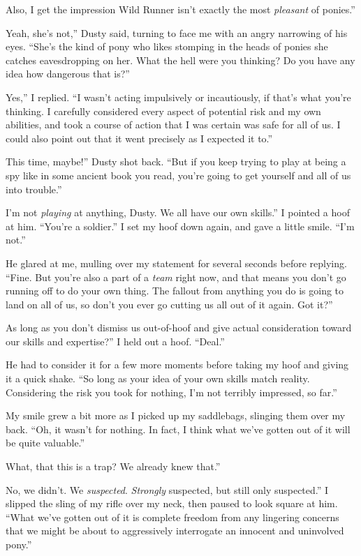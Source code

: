 \leavevmode{}Also, I get the impression Wild Runner isn’t exactly the most \textit{pleasant} of ponies.”

\leavevmode{}Yeah, she’s not,” Dusty said, turning to face me with an angry narrowing of his eyes. “She’s the kind of pony who likes stomping in the heads of ponies she catches eavesdropping on her. What the hell were you thinking? Do you have any idea how dangerous that is?”

\leavevmode{}Yes,” I replied. “I wasn’t acting impulsively or incautiously, if that’s what you’re thinking. I carefully considered every aspect of potential risk and my own abilities, and took a course of action that I was certain was safe for all of us. I could also point out that it went precisely as I expected it to.”

\leavevmode{}This time, maybe!” Dusty shot back. “But if you keep trying to play at being a spy like in some ancient book you read, you’re going to get yourself and all of us into trouble.”

\leavevmode{}I’m not \textit{playing} at anything, Dusty. We all have our own skills.” I pointed a hoof at him. “You’re a soldier.” I set my hoof down again, and gave a little smile. “I’m not.”

He glared at me, mulling over my statement for several seconds before replying. “Fine. But you’re also a part of a \textit{team} right now, and that means you don’t go running off to do your own thing. The fallout from anything you do is going to land on all of us, so don’t you ever go cutting us all out of it again. Got it?”

\leavevmode{}As long as you don’t dismiss us out-of-hoof and give actual consideration toward our skills and expertise?” I held out a hoof. “Deal.”

He had to consider it for a few more moments before taking my hoof and giving it a quick shake. “So long as your idea of your own skills match reality. Considering the risk you took for nothing, I’m not terribly impressed, so far.”

My smile grew a bit more as I picked up my saddlebags, slinging them over my back. “Oh, it wasn’t for nothing. In fact, I think what we’ve gotten out of it will be quite valuable.”

\leavevmode{}What, that this is a trap? We already knew that.”

\leavevmode{}No, we didn’t. We \textit{suspected}. \textit{Strongly} suspected, but still only suspected.” I slipped the sling of my rifle over my neck, then paused to look square at him. “What we’ve gotten out of it is complete freedom from any lingering concerns that we might be about to aggressively interrogate an innocent and uninvolved pony.”

